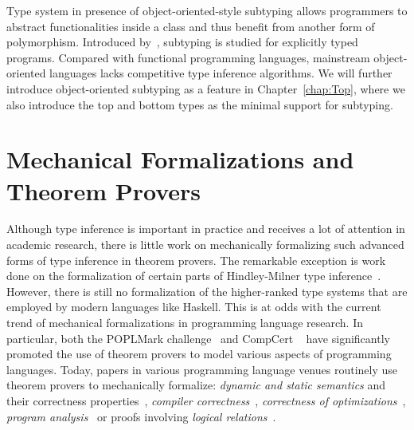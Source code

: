 Type system in presence of object-oriented-style subtyping allows
programmers to abstract functionalities inside a class
and thus benefit from another form of polymorphism.
Introduced by~\citet{Mitchell1984,Reynolds1985,Cardelli1988},
subtyping is studied for explicitly typed programs.
Compared with functional programming languages,
mainstream object-oriented languages lacks competitive type inference algorithms.
We will further introduce object-oriented subtyping as a feature in Chapter~\ref{chap:Top},
where we also introduce the top and bottom types as the minimal support for subtyping.

\section{Mechanical Formalizations and Theorem Provers}

Although type inference is important in practice and
receives a lot of attention in
academic research, there is little work on mechanically formalizing
such advanced forms of type inference in theorem provers.
The remarkable exception is work done on the formalization of 
certain parts of Hindley-Milner type inference~\citep{naraschewski1999type,
dubois2000proving,dubois1999certification,urban2008nominal,
garrigue2015certified}. However,
there is still no formalization of the higher-ranked type systems
that are employed by modern languages like Haskell.
This is at
odds with the current trend of mechanical formalizations in
programming language research. In particular, both the POPLMark
challenge~\citep{aydemir2005mechanized} and
CompCert ~\citep{leroy2012compcert} have significantly promoted
the use of theorem provers to model various aspects of programming
languages. Today, papers in various programming language venues routinely
use theorem provers to mechanically formalize: \emph{dynamic and
  static semantics} and their correctness properties~\citep{aydemir2008engineering},
\emph{compiler correctness}~\citep{leroy2012compcert}, \emph{correctness of
  optimizations}~\citep{Bertot04}, \emph{program analysis}~\citep{Chang2006}
or proofs involving \emph{logical relations}~\citep{abel2018}.

